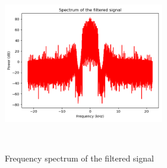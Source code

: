 \begin{enumerate}
\begin{enumerate}[a)]
                \begin{marginfigure}
                  \includegraphics[width=7.0cm,height=7.0cm]{ch13/figures/freq_spec_filter.png}
                  \caption{Frequency spectrum of the filtered signal}
                  \label{freq_spec_filter}
                \end{marginfigure}

        \end{enumerate}
\end{enumerate}